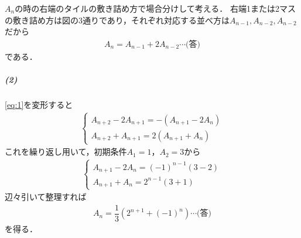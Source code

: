 \documentclass[../../main.tex]{subfiles}
\begin{document}
$A_n$の時の右端のタイルの敷き詰め方で場合分けして考える．
右端1または2マスの敷き詰め方は図の3通りであり，それぞれ対応する並べ方は$A_{n-1},A_{n-2},A_{n-2}$だから
\begin{align}
  A_n=A_{n-1}+2A_{n-2}\cdots\text{(答)} \label{eq:1}
\end{align}
である．

\subparagraph{(2)}

\cref{eq:1}を変形すると
\begin{align}
  \begin{cases}
    A_{n+2}-2A_{n+1}=-(A_{n+1}-2A_{n}) \\
    A_{n+2}+A_{n+1}=2( A_{n+1}+A_{n})
  \end{cases}
\end{align}
これを繰り返し用いて，初期条件$A_1=1$，$A_2=3$から
\begin{align}
  \begin{cases}
    A_{n+1}-2A_{n}=(-1)^{n-1}(3-2) \\
    A_{n+1}+A_{n}=2^{n-1}(3+1)
  \end{cases}
\end{align}
辺々引いて整理すれば
\begin{align}
  A_n=\dfrac{1}{3}\left(2^{n+1}+(-1)^n\right)\cdots\text{(答)}
\end{align}
を得る．
\newpage
\end{document}
